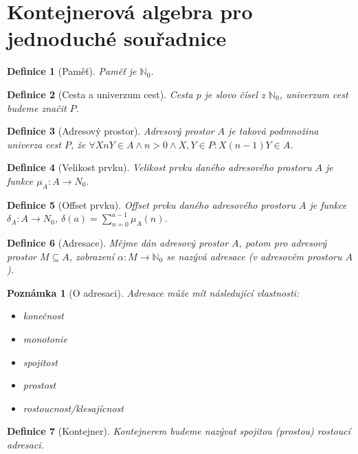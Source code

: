 \documentclass[a4paper,12pt]{article}
\newtheorem{definition}{Definice}[section]
\newtheorem{corollary}{Poznámka}[definition]
\begin{document}
\section{Kontejnerová algebra pro jednoduché souřadnice}

\begin{definition}[Paměť]
Paměť je $\mathbb{N}_0$.
\end{definition}

\begin{definition}[Cesta a univerzum cest]
Cesta $p$ je slovo čísel z $\mathbb{N}_0$, univerzum cest budeme značit $P$.
\end{definition}

\begin{definition}[Adresový prostor]
Adresový prostor $A$ je taková podmnožina univerza cest $P$, že $\forall X n Y \in A \wedge n > 0 \wedge X,Y \in P: X (n - 1) Y \in A$.
\end{definition}

\begin{definition}[Velikost prvku]
Velikost prvku daného adresového prostoru $A$ je funkce $\mu_A: A \to N_0$.
\end{definition}

\begin{definition}[Offset prvku]
Offset prvku daného adresového prostoru $A$ je funkce $\delta_A: A \to N_0$, $\delta(a) = \sum\limits_{n=0}^{a-1} \mu_A(n)$.
\end{definition}

\begin{definition}[Adresace]
Mějme dán adresový prostor $A$, potom pro adresový prostor $M \subseteq A$, zobrazení $\alpha: M \to \mathbb{N}_0$ se nazývá adresace (v adresovém prostoru $A$).
\end{definition}

\begin{corollary}[O adresaci]
Adresace může mít následující vlastnosti:
\begin{itemize}
    \item konečnost
    \item monotonie
    \item spojitost
    \item prostost
    \item rostoucnost/klesajícnost
\end{itemize}
\end{corollary}

\begin{definition}[Kontejner]
    Kontejnerem budeme nazývat spojitou (prostou) rostoucí adresaci.
\end{definition}
\end{document}
